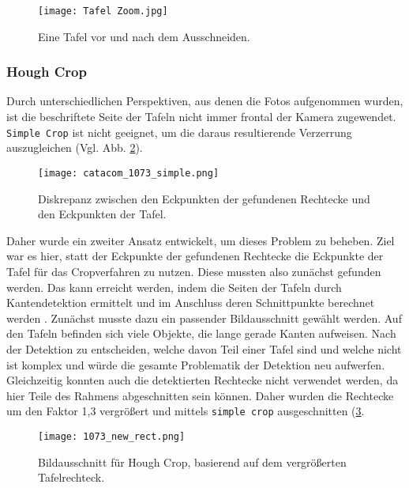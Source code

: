 \begin{figure}[h!]
\centering
\texttt{[image: Tafel Zoom.jpg]}
\caption{Eine Tafel vor und nach dem Ausschneiden.}
\label{fig:tafelcrop}
\end{figure}

\subsubsection{Hough Crop}

Durch unterschiedlichen Perspektiven, aus denen die Fotos aufgenommen wurden, ist die beschriftete Seite der Tafeln nicht immer frontal der Kamera zugewendet. \verb|Simple Crop| ist nicht geeignet, um die daraus resultierende Verzerrung auszugleichen (Vgl. Abb. \ref{fig:parallelogramm}). 

\begin{figure}[h!]
\centering
\texttt{[image: catacom\_1073\_simple.png]}
\caption{Diskrepanz zwischen den Eckpunkten der gefundenen Rechtecke und den Eckpunkten der Tafel.}
\label{fig:parallelogramm}
\end{figure}

Daher wurde ein zweiter Ansatz entwickelt, um dieses Problem zu beheben. Ziel war es hier, statt der Eckpunkte der gefundenen Rechtecke die Eckpunkte der Tafel für das Cropverfahren zu nutzen. Diese mussten also zunächst gefunden werden. Das kann erreicht werden, indem die Seiten der Tafeln durch Kantendetektion ermittelt und im Anschluss deren Schnittpunkte berechnet werden \cite{qixiangye}.
Zunächst musste dazu ein passender Bildausschnitt gewählt werden. Auf den Tafeln befinden sich viele Objekte, die lange gerade Kanten aufweisen. Nach der Detektion zu entscheiden, welche davon Teil einer Tafel sind und welche nicht ist komplex und würde die gesamte Problematik der Detektion neu aufwerfen. Gleichzeitig konnten auch die detektierten Rechtecke nicht verwendet werden, da hier Teile des Rahmens abgeschnitten sein können. Daher wurden die Rechtecke um den Faktor 1,3 vergrößert und mittels \verb|simple crop| ausgeschnitten (\ref{fig:tafelrechteck}.

\begin{figure}[h!]
\centering
\texttt{[image: 1073\_new\_rect.png]}
\caption{Bildausschnitt für Hough Crop, basierend auf dem vergrößerten Tafelrechteck.}
\label{fig:tafelrechteck}
\end{figure}

